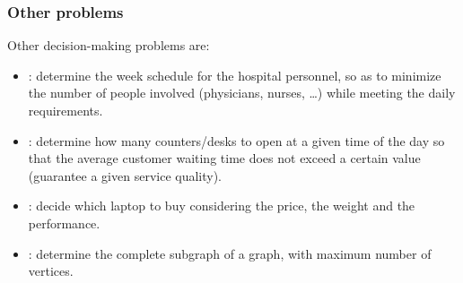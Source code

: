 \longline

\subsubsection{Other problems}

Other decision-making problems are:
\begin{itemize}
    \item {}: determine the week schedule for the hospital personnel, so as to minimize the number of people involved (physicians, nurses, \dots) while meeting the daily requirements.
    
    \item {}: determine how many counters/desks to open at a given time of the day so that the average customer waiting time does not exceed a certain value (guarantee a given service quality).

    \item {}: decide which laptop to buy considering the price, the weight and the performance.

    \item {}: determine the complete subgraph of a graph, with maximum number of vertices.
\end{itemize}